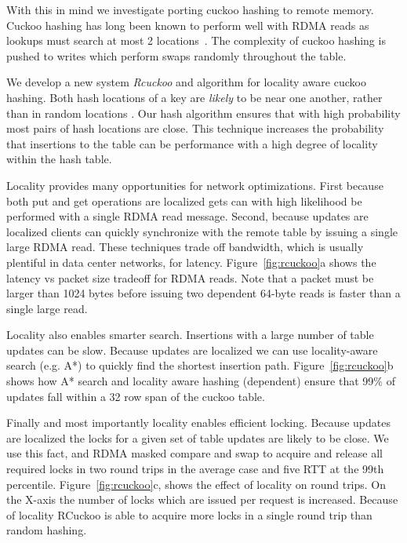 With this in mind we investigate porting cuckoo hashing to
remote memory. Cuckoo hashing has long been known to perform
well with RDMA reads as lookups must search at most 2
locations~\cite{pilaf, farm}. The complexity of cuckoo
hashing is pushed to writes which perform swaps randomly
throughout the table. 

We develop a new system \textit{Rcuckoo} and algorithm for
locality aware cuckoo hashing. Both hash locations of a key
are \textit{likely} to be near one another, rather than in
random locations . Our hash algorithm ensures that with high
probability most pairs of hash locations are close.  This
technique increases the probability that insertions to the
table can be performance with a high degree of locality
within the hash table.

Locality provides many opportunities for network
optimizations. First because both put and get operations are
localized gets can with high likelihood be performed with a
single RDMA read message. Second, because updates are
localized clients can quickly synchronize with the remote
table by issuing a single large RDMA read. These techniques
trade off bandwidth, which is usually plentiful in data
center networks, for latency. Figure~\ref{fig:rcuckoo}a shows
the latency vs packet size tradeoff for RDMA reads. Note that
a packet must be larger than 1024 bytes before issuing two
dependent 64-byte reads is faster than a single large read.

Locality also enables smarter search. Insertions with a
large number of table updates can be slow. Because updates
are localized we can use locality-aware search (e.g. A*) to
quickly find the shortest insertion path.
Figure~\ref{fig:rcuckoo}b shows how A* search and locality
aware hashing (dependent) ensure that 99\% of updates fall
within a 32 row span of the cuckoo table.

Finally and most importantly locality enables efficient
locking. Because updates are localized the locks for a given
set of table updates are likely to be close. We use this
fact, and RDMA masked compare and swap  to
acquire and release all required locks in two round trips in
the average case and five RTT at the 99th percentile.
Figure~\ref{fig:rcuckoo}c, shows the effect of locality on
round trips. On the X-axis the number of locks which are
issued per request is increased. Because of locality RCuckoo
is able to acquire more locks in a single round trip than
random hashing.



